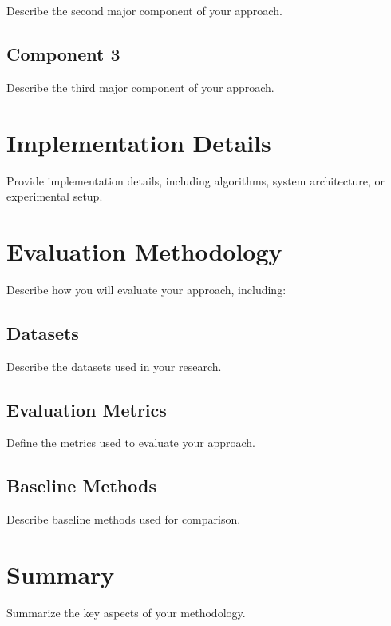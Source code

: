 Describe the second major component of your approach.

\subsection{Component 3}
\label{subsec:component3}

Describe the third major component of your approach.

\section{Implementation Details}
\label{sec:implementation}

Provide implementation details, including algorithms, system architecture, or experimental setup.

\section{Evaluation Methodology}
\label{sec:evaluation}

Describe how you will evaluate your approach, including:

\subsection{Datasets}
\label{subsec:datasets}

Describe the datasets used in your research.

\subsection{Evaluation Metrics}
\label{subsec:metrics}

Define the metrics used to evaluate your approach.

\subsection{Baseline Methods}
\label{subsec:baselines}

Describe baseline methods used for comparison.

\section{Summary}
\label{sec:meth-summary}

Summarize the key aspects of your methodology.
